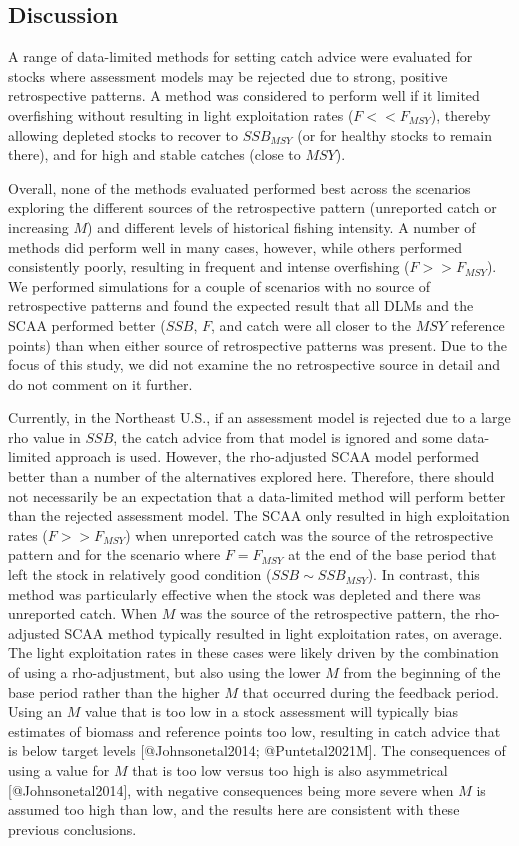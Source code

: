 \documentclass[
  12pt,
]{article}
\begin{document}
\hypertarget{discussion}{%
\subsection{Discussion}\label{discussion}}

A range of data-limited methods for setting catch advice were evaluated for stocks where assessment models may be rejected due to strong, positive retrospective patterns. A method was considered to perform well if it limited overfishing without resulting in light exploitation rates (\(F << F_{MSY}\)), thereby allowing depleted stocks to recover to \(SSB_{MSY}\) (or for healthy stocks to remain there), and for high and stable catches (close to \(MSY\)).

Overall, none of the methods evaluated performed best across the scenarios exploring the different sources of the retrospective pattern (unreported catch or increasing \(M\)) and different levels of historical fishing intensity. A number of methods did perform well in many cases, however, while others performed consistently poorly, resulting in frequent and intense overfishing (\(F>>F_{MSY}\)). We performed simulations for a couple of scenarios with no source of retrospective patterns and found the expected result that all DLMs and the SCAA performed better (\(SSB\), \(F\), and catch were all closer to the \(MSY\) reference points) than when either source of retrospective patterns was present. Due to the focus of this study, we did not examine the no retrospective source in detail and do not comment on it further.

Currently, in the Northeast U.S., if an assessment model is rejected due to a large rho value in \(SSB\), the catch advice from that model is ignored and some data-limited approach is used. However, the rho-adjusted SCAA model performed better than a number of the alternatives explored here. Therefore, there should not necessarily be an expectation that a data-limited method will perform better than the rejected assessment model. The SCAA only resulted in high exploitation rates (\(F >> F_{MSY}\)) when unreported catch was the source of the retrospective pattern and for the scenario where \(F=F_{MSY}\) at the end of the base period that left the stock in relatively good condition (\(SSB \sim SSB_{MSY}\)). In contrast, this method was particularly effective when the stock was depleted and there was unreported catch. When \(M\) was the source of the retrospective pattern, the rho-adjusted SCAA method typically resulted in light exploitation rates, on average. The light exploitation rates in these cases were likely driven by the combination of using a rho-adjustment, but also using the lower \(M\) from the beginning of the base period rather than the higher \(M\) that occurred during the feedback period. Using an \(M\) value that is too low in a stock assessment will typically bias estimates of biomass and reference points too low, resulting in catch advice that is below target levels {[}@Johnsonetal2014; @Puntetal2021M{]}. The consequences of using a value for \(M\) that is too low versus too high is also asymmetrical {[}@Johnsonetal2014{]}, with negative consequences being more severe when \(M\) is assumed too high than low, and the results here are consistent with these previous conclusions.
\end{document}
